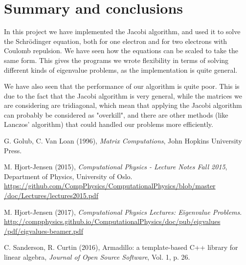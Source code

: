 \documentclass[12pt, a4paper]{article}
\begin{document}
\section{Summary and conclusions}

In this project we have implemented the Jacobi algorithm, and used it to solve the Schrödinger equation, 
both for one electron and for two electrons with Coulomb repulsion. We have seen how the equations can 
be scaled to take the same form. This gives the programs we wrote flexibility in terms of solving 
different kinds of eigenvalue problems, as the implementation is quite general. 

We have also seen that the performance of our algorithm is quite poor. This is due to the fact that the 
Jacobi algorithm is very general, while the matrices we are considering are tridiagonal, which mean that 
applying the Jacobi algorithm can probably be considered as "overkill", and there are other methods 
(like Lanczos’ algorithm) that could handled our problems more efficiently.  

\begin{thebibliography}{40}

 G. Golub, C. Van Loan (1996), \textit{Matrix Computations}, John Hopkins University 
Press. 

 M. Hjort-Jensen (2015), \textit{Computational Physics - Lecture Notes Fall 2015}, 
Department of Physics, University of Oslo. \\ 
\href{https://github.com/CompPhysics/ComputationalPhysics/blob/master/doc/Lectures/lectures2015.pdf}
{https://github.com/CompPhysics/ComputationalPhysics/blob/master\\/doc/Lectures/lectures2015.pdf}

 M. Hjort-Jensen (2017), \textit{Computational Physics Lectures: 
Eigenvalue Problems}. 
\href{http://compphysics.github.io/ComputationalPhysics/doc/pub/eigvalues/pdf/eigvalues-beamer.pdf}
{http://compphysics.github.io/ComputationalPhysics/doc/pub/eigvalues\\/pdf/eigvalues-beamer.pdf}

 C. Sanderson, R. Curtin (2016), Armadillo: a template-based C++ library for linear 
algebra, \textit{Journal of Open Source Software}, Vol. 1, p. 26.  

\end{thebibliography}
\end{document}
